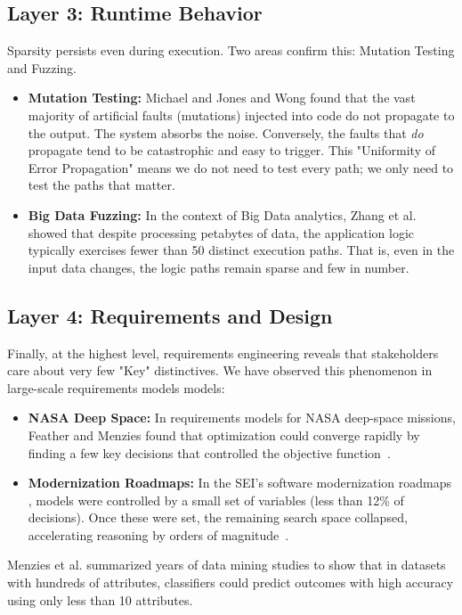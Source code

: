 \documentclass[pdflatex,sn-basic]{sn-jnl}
\begin{document}
\subsection{Layer 3: Runtime Behavior}
Sparsity persists even during execution. Two areas confirm this: Mutation 
Testing and Fuzzing.
\begin{itemize}
    \item \textbf{Mutation Testing:} Michael and Jones 
    \citep{michael1997uniformity} and Wong \citep{wong1995reducing} found that 
    the vast majority of artificial faults (mutations) injected into code 
    do not propagate to the output. The system absorbs the noise. Conversely, 
    the faults that \textit{do} propagate tend to be catastrophic and easy to 
    trigger. This "Uniformity of Error Propagation" means we do not need to 
    test every path; we only need to test the paths that matter.
    \item \textbf{Big Data Fuzzing:} In the context of Big Data analytics, 
    Zhang et al. \citep{Zhang20BigFuzz} showed that despite processing petabytes 
    of data, the application logic typically exercises fewer than 50 distinct 
    execution paths. That is, even in the input data changes,  the logic paths remain sparse and few in number.
\end{itemize}

\subsection{Layer 4: Requirements and Design}
Finally, at the highest level, requirements engineering reveals that stakeholders 
care about very few "Key" distinctives. 
 We have observed this phenomenon in
large-scale requirements models models:

\begin{itemize}
    \item \textbf{NASA Deep Space:} In requirements models for NASA
    deep-space missions, Feather and Menzies found that optimization
    could converge rapidly by finding a few key decisions that
    controlled the objective function~\citep{Feather02}.

    \item \textbf{Modernization Roadmaps:} In the SEI's software modernization roadmaps \citep{ernst2016}, models were controlled
    by a small set of variables (less than 12\% of decisions). Once these
    were set, the remaining search space collapsed, accelerating
    reasoning by orders of magnitude~\citep{Mathews17}.
\end{itemize}
Menzies et al. \citep{MenziesKeys21} 
summarized years of data mining studies to show that in datasets with hundreds 
of attributes, classifiers could predict outcomes with high accuracy using 
only less than 10 attributes.
\end{document}
